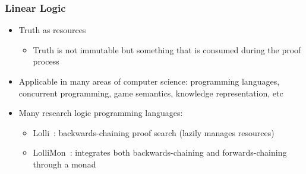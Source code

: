 \documentclass{beamer}
\begin{document}

\frame
{
   \frametitle{Linear Logic}
   \begin{itemize}
      \item Truth as resources
      \begin{itemize}
         \item Truth is not immutable but something that is consumed during the proof process
      \end{itemize}
      \item Applicable in many areas of computer science: programming languages, concurrent programming, game semantics, knowledge representation, etc
      \item Many research logic programming languages:
      \begin{itemize}
         \item Lolli~\cite{Hodas94logicprogramming}: backwards-chaining proof search (lazily manages resources)
         \item LolliMon~\cite{Lopez:2005:MCL:1069774.1069778}: integrates both backwards-chaining and forwards-chaining through a monad
      \end{itemize}
   \end{itemize}
}
\end{document}
